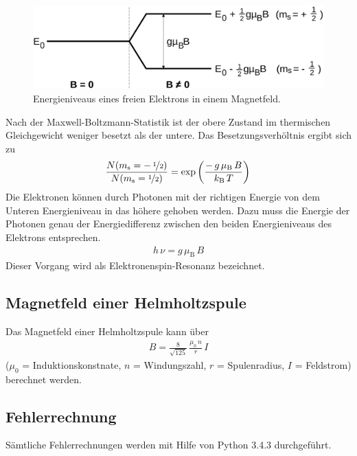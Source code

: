 \begin{figure}[H]
	\centering
	\includegraphics[width=\linewidth]{picture/EnergiequantelungElektron.pdf}
	\caption{Energieniveaus eines freien Elektrons in einem Magnetfeld. \cite{V28}}
	\label{fig:EnergiequantelungElektron}
\end{figure}

Nach der Maxwell-Boltzmann-Statistik ist der obere Zustand im thermischen Gleichgewicht weniger besetzt als der untere. Das Besetzungsverhöltnis ergibt sich zu
\begin{align}
	\frac{N(m_\text{s} = -\,\nicefrac{1}{2})}{N(m_\text{s} = \nicefrac{1}{2})} = \exp\left( \frac{-\,g\,\mu_\text{B}\,B}{k_\text{B}\,T} \right)
\end{align}
Die Elektronen können durch Photonen mit der richtigen Energie von dem Unteren Energieniveau in das höhere gehoben werden. Dazu muss die Energie der Photonen genau der Energiedifferenz zwischen den beiden Energieniveaus des Elektrons entsprechen.
\begin{align}
	h\,\nu = g\, \mu_\text{B}\, B
\end{align}
Dieser Vorgang wird als Elektronenspin-Resonanz bezeichnet.



\subsection{Magnetfeld einer Helmholtzspule}
Das Magnetfeld einer Helmholtzspule kann über
\begin{align}\label{eqn:BHelm} %
	B = \frac{8}{\sqrt{125}}\, \frac{\mu_0\, n}{r}\, I
\end{align}
\hfill {\footnotesize($\mu_0$ = Induktionskonstnate, $n$ = Windungszahl, $r$ = Spulenradius, $I$ = Feldstrom)} \hfill \vspace{0.25cm}\\
berechnet werden.


\newpage
\subsection{Fehlerrechnung}
Sämtliche Fehlerrechnungen werden mit Hilfe von Python 3.4.3 durchgeführt.
